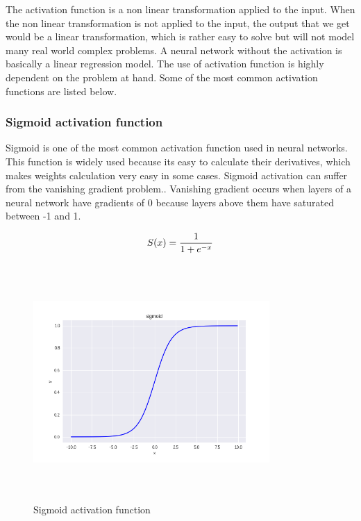 The activation function is a non linear transformation applied to the input. When the non linear transformation is not applied to the input, the output that we get would be a linear transformation, which is rather easy to solve but will not model many real world complex problems. A neural network without the activation is basically a linear regression model. The use of activation function is highly dependent on the problem at hand. Some of the most common activation functions are listed below.

\subsubsection*{Sigmoid activation function}
Sigmoid is one of the most common activation function used in neural networks. This function is widely used because its easy to calculate their derivatives, which makes weights calculation very easy in some cases. Sigmoid activation can suffer from the vanishing gradient problem.\cite{bengio1994learning}. Vanishing gradient occurs when layers of a neural network have gradients of $0$ because layers above them have saturated between -1 and 1. \cite{maas2013rectifier}


\begin{equation}
S(x) = \frac{1}{1+e^{-x}} \\
\label{eq:sig}
\end{equation}

\begin{figure}[!ht]
    \centering
    \captionsetup{justification=centering,margin=2cm}
    \includegraphics[width=9cm, height=9cm, keepaspectratio]{pics/sigmoid_10.png}
    \caption{Sigmoid activation function}
    \label{fig:sigmoidActivation}
\end{figure}

